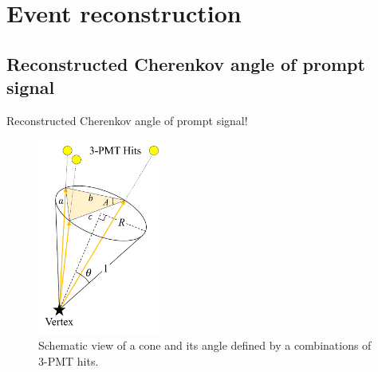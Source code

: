 
%
%

\section{Event reconstruction}\label{Section_EventReco}

\subsection{Reconstructed Cherenkov angle of prompt signal}
\vs\hs Reconstructed Cherenkov angle of prompt signal!

\begin{figure}[tbp]
	\centering
	\includegraphics[width=4cm]{Figures/EventReco/RecoOpeAng}
	\caption[Schematic view of a cone and its angle defined by a combinations of 3-PMT hits]{\label{EventReco_RecoOpeAng} Schematic view of a cone and its angle defined by a combinations of 3-PMT hits.}
\end{figure}

\newpage
